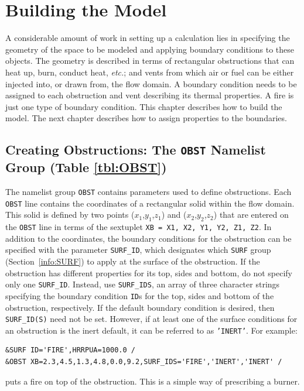 \documentclass[11pt]{book}
\newcommand{\ct}{\tt\small}
\begin{document}
\chapter{Building the Model}

A considerable amount of work in setting up a calculation lies in specifying the
geometry of the space to be modeled and applying boundary conditions
to these objects. The geometry is described in terms
of rectangular obstructions that can heat up, burn, conduct heat, {\em etc.};
and vents from which air or fuel can be
either injected into, or drawn from, the flow domain.
A boundary condition needs to be assigned to each obstruction
and vent describing its thermal properties. A fire is just one type of
boundary condition. This chapter describes how to build the model. The next
chapter describes how to assign properties to the boundaries.



\section{Creating Obstructions: The \texorpdfstring{{\tt OBST}}{OBST} Namelist Group (Table \ref{tbl:OBST})}
\label{info:OBST}

The namelist group {\ct OBST} contains parameters used to define obstructions.
Each {\ct OBST} line contains the coordinates of a rectangular
solid within the flow domain. This solid is defined by two points
($x_1$,$y_1$,$z_1$) and ($x_2$,$y_2$,$z_2$) that are entered on the
{\ct OBST} line in terms of the sextuplet {\ct XB = X1, X2, Y1, Y2, Z1, Z2}.
In addition to the coordinates, the boundary conditions for the obstruction
can be specified with the parameter {\ct SURF\_ID}, which designates which
{\ct SURF} group (Section~\ref{info:SURF}) to apply at the surface of the obstruction.
If the obstruction has different properties for its top,
sides and bottom, do not specify only one {\ct SURF\_ID}. Instead, use {\ct SURF\_IDS}, an array of three character
strings specifying the boundary condition {\ct ID}s for the top,
sides and bottom of the obstruction, respectively.
If the default
boundary condition is desired, then {\ct SURF\_ID(S)} need not be set.
However, if at least one of the surface conditions for an
obstruction is the inert default, it can be referred to as {\ct 'INERT'}.
For example:

\footnotesize
\begin{verbatim}
&SURF ID='FIRE',HRRPUA=1000.0 /
&OBST XB=2.3,4.5,1.3,4.8,0.0,9.2,SURF_IDS='FIRE','INERT','INERT' /
\end{verbatim}
\normalsize
puts a fire on top of the obstruction. This is a simple way of
prescribing a burner.
\end{document}
